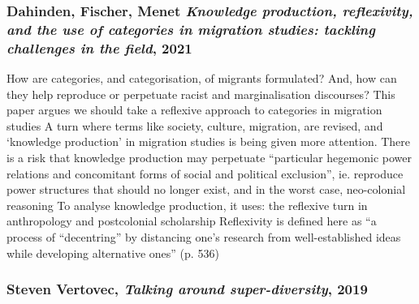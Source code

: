 \documentclass{article}
\begin{document}
\subsubsection{Dahinden, Fischer, Menet \textit{Knowledge production, reflexivity, and the use of categories in migration studies: tackling challenges in the field}, 2021}

\begin{outline}
	\1 How are categories, and categorisation, of migrants formulated? And, how can they help reproduce or perpetuate racist and marginalisation discourses? This paper argues we should take a reflexive approach to categories in migration studies
	\1 A turn where terms like society, culture, migration, are revised, and `knowledge production' in migration studies is being given more attention. There is a risk that knowledge production may perpetuate ``particular hegemonic power relations and concomitant forms of social and political exclusion'', ie. reproduce power structures that should no longer exist, and in the worst case, neo-colonial reasoning
	\1 To analyse knowledge production, it uses: the reflexive turn in anthropology and postcolonial scholarship
	\1 Reflexivity is defined here as ``a process of ``decentring'' by distancing one's research from well-established ideas while developing alternative ones'' (p. 536)
		\2 
\end{outline}

\subsubsection{Steven Vertovec, \textit{Talking around super-diversity}, 2019}
\end{document}

